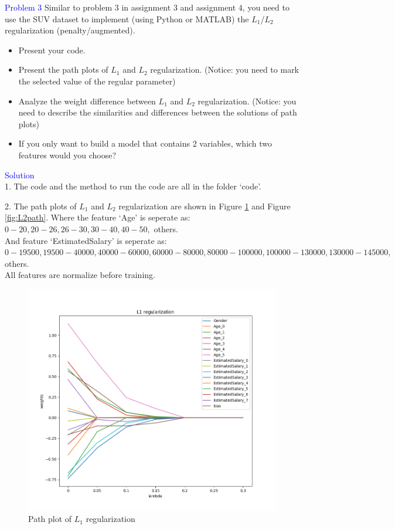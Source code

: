 \textcolor{blue}{Problem 3}
Similar to problem $3$ in assignment $3$ and assignment $4$, you need to use the SUV dataset to implement (using Python or MATLAB) the $L_1$/$L_2$ regularization (penalty/augmented).
\begin{itemize}
    \item Present your code.
    \item Present the path plots of $L_1$ and $L_2$ regularization. (Notice: you need to mark the selected value of the regular parameter)
    \item Analyze the weight difference between $L_1$ and $L_2$ regularization. (Notice: you need to describe the similarities and differences between the solutions of path plots)
    \item If you only want to build a model that contains $2$ variables, which two features would you choose?
\end{itemize}

\textcolor{blue}{Solution}\\


1. The code and the method to run the code are all in the folder `code'.

2. The path plots of $L_1$ and $L_2$ regularization are shown in Figure \ref{fig:L1path} and Figure \ref{fig:L2path}.
Where the feature `Age' is seperate as: $0-20, 20-26, 26-30, 30-40, 40-50,$ others.\\
And feature `EstimatedSalary' is seperate as: $0-19500, 19500-40000, 40000-60000, 60000-80000, 80000-100000, 100000-130000, 130000-145000,$ others.\\
All features are normalize before training.\\

\begin{figure}[htbp]
    \center
    \includegraphics[width=\textwidth]{../fig/L1.png}
    \caption{Path plot of $L_1$ regularization}
    \label{fig:L1path}
\end{figure}

